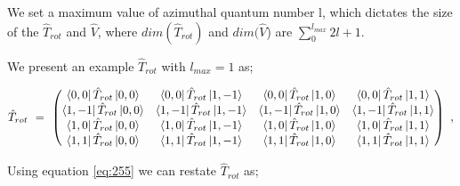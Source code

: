 \documentclass{article}
\begin{document}
We set a maximum value of azimuthal quantum number l, which dictates the size of the \begin{math} \hat{T}_{rot} \end{math} and \begin{math} \hat{V} \end{math}, where \begin{math} dim(\hat{T}_{rot}) \end{math} and \begin{math} dim(\hat{V} \end{math}) are \begin{math} \sum_{0}^{l_{max}} 2l + 1 \end{math}. 

We present an example \begin{math} \hat{T}_{rot} \end{math} with \begin{math} l_{max} = 1 \end{math} as;

\begin{equation} \label{eq:266}
\hat{T}_{rot} \hspace{0.125cm} = \hspace{0.125cm} \begin{pmatrix} \bra{0,0}\hat{T}_{rot}\ket{0,0} & \bra{0,0}\hat{T}_{rot}\ket{1,-1} & \bra{0,0}\hat{T}_{rot}\ket{1,0} & \bra{0,0}\hat{T}_{rot}\ket{1,1} \\ \bra{1,-1}\hat{T}_{rot}\ket{0,0} & \bra{1,-1}\hat{T}_{rot}\ket{1,-1} & \bra{1,-1}\hat{T}_{rot}\ket{1,0} & \bra{1,-1}\hat{T}_{rot}\ket{1,1} \\ \bra{1,0}\hat{T}_{rot}\ket{0,0} & \bra{1,0}\hat{T}_{rot}\ket{1,-1} & \bra{1,0}\hat{T}_{rot}\ket{1,0} & \bra{1,0}\hat{T}_{rot}\ket{1,1} \\ \bra{1,1}\hat{T}_{rot}\ket{0,0} & \bra{1,1}\hat{T}_{rot}\ket{1,-1} & \bra{1,1}\hat{T}_{rot}\ket{1,0} & \bra{1,1}\hat{T}_{rot}\ket{1,1}
\end{pmatrix} \hspace{0.125cm} ,
\end{equation} 

Using equation \ref{eq:255} we can restate \begin{math} \hat{T}_{rot} \end{math} as;

\end{document}

